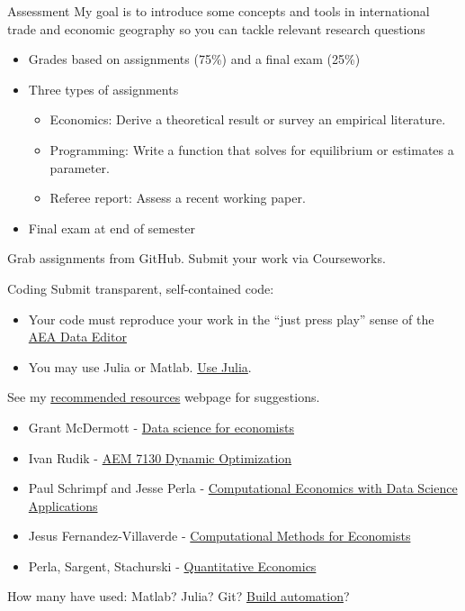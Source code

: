 \documentclass[10pt,notes=hide,aspectratio=169]{beamer}
\begin{document}
\begin{frame}{Assessment}
My goal is to introduce some concepts and tools in international trade and economic geography so you can tackle relevant research questions
\begin{itemize}
\item Grades based on assignments (75\%) and a final exam (25\%)
\item Three types of assignments
\begin{itemize}
\item Economics: Derive a theoretical result or survey an empirical literature.
\item Programming: Write a function that solves for equilibrium or estimates a parameter.
\item Referee report: Assess a recent working paper.
\end{itemize}
\item Final exam at end of semester
\end{itemize}
Grab assignments from GitHub.
Submit your work via Courseworks.
\end{frame}
\begin{frame}{Coding}
Submit transparent, self-contained code:
\begin{itemize}
\item Your code must reproduce your work in the ``just press play'' sense of the \href{https://www.aeaweb.org/journals/data/faq\#run}{AEA Data Editor}
\item You may use Julia or Matlab. \href{https://tradediversion.net/2018/09/17/why-i-encourage-econ-phd-students-to-learn-julia/}{Use Julia}.
\end{itemize}
See my \href{http://www.jdingel.com/teaching/advice.html}{recommended resources} webpage for suggestions.
\begin{itemize}
\item Grant McDermott - \href{https://github.com/uo-ec607/lectures}{Data science for economists}
\item Ivan Rudik - \href{https://github.com/AEM7130/class-repo}{AEM 7130 Dynamic Optimization}
\item Paul Schrimpf and Jesse Perla - \href{https://github.com/ubcecon/ECON622/}{Computational Economics with Data Science Applications}
\item Jesus Fernandez-Villaverde - \href{https://www.sas.upenn.edu/~jesusfv/teaching.html}{Computational Methods for Economists}
\item Perla, Sargent, Stachurski - \href{https://julia.quantecon.org/intro.html}{Quantitative Economics}
\end{itemize}
How many have used: Matlab? Julia? Git? \href{https://tradediversion.net/2019/11/06/why-your-research-project-needs-build-automation/}{Build automation}?
\end{frame}
\end{document}
